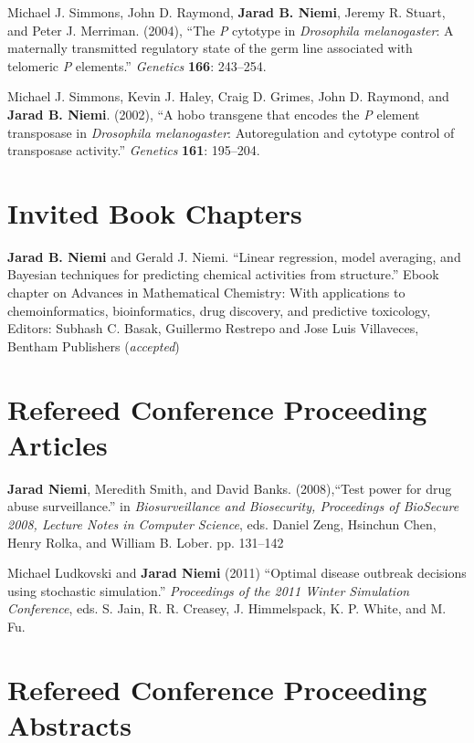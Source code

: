 \documentclass[overlapped,line,letterpaper]{res}
\begin{document}
\begin{resume}
Michael J. Simmons, John D. Raymond, {\bf Jarad B. Niemi}, Jeremy R. Stuart, and Peter J. Merriman. (2004), ``The \emph{P} cytotype in \emph{Drosophila melanogaster}: A maternally transmitted regulatory state of the germ line associated with telomeric \emph{P} elements.'' \emph{Genetics} {\bf 166}: 243--254.

Michael J. Simmons, Kevin J. Haley, Craig D. Grimes, John D. Raymond, and {\bf Jarad B. Niemi}. (2002), ``A hobo transgene that encodes the \emph{P} element transposase in \emph{Drosophila melanogaster}: Autoregulation and cytotype control of transposase activity.'' \emph{Genetics} {\bf 161}: 195--204.




\section{\bf Invited Book Chapters}

{\bf Jarad B. Niemi} and Gerald J. Niemi. ``Linear regression, model averaging, and Bayesian techniques for predicting chemical activities from structure.'' Ebook chapter on Advances in Mathematical Chemistry: With applications to chemoinformatics, bioinformatics, drug discovery, and predictive toxicology, Editors: Subhash C. Basak, Guillermo Restrepo and Jose Luis Villaveces, Bentham Publishers (\emph{accepted})

\section{\bf Refereed Conference Proceeding Articles}

{\bf Jarad Niemi}, Meredith Smith, and David Banks. (2008),``Test power for drug abuse surveillance.'' in \emph{Biosurveillance and Biosecurity, Proceedings of BioSecure 2008, Lecture Notes in Computer Science},  eds. Daniel Zeng, Hsinchun Chen, Henry Rolka, and William B. Lober. pp. 131--142

Michael Ludkovski and {\bf Jarad Niemi} (2011) ``Optimal disease outbreak decisions using stochastic simulation.'' \emph{Proceedings of the 2011 Winter Simulation Conference}, eds. S. Jain, R. R. Creasey, J. Himmelspack, K. P. White, and M. Fu.

\section{\bf Refereed Conference Proceeding Abstracts}


\end{resume}
\end{document}
